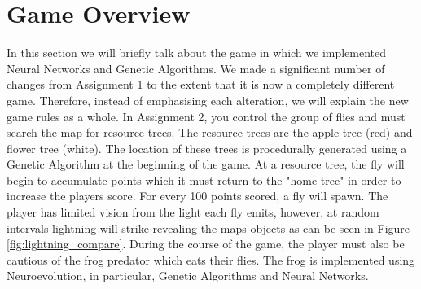 \section{Game Overview}
In this section we will briefly talk about the game in which we implemented Neural Networks and Genetic Algorithms.
We made a significant number of changes from Assignment 1 to the extent that it is now a completely different game. 
Therefore, instead of emphasising each alteration, we will explain the new game rules as a whole.
In Assignment 2, you control the group
of flies and must search the map for resource trees. The resource trees are the apple tree (red) and flower tree (white).
The location of these trees is procedurally generated using a Genetic Algorithm at the beginning of the game. At a resource tree, the fly will begin to accumulate points which it must return to the "home tree" in order to increase the players score. For every 100 points scored, a fly will spawn.
The player has limited vision from
the light each fly emits, however, at random intervals lightning will strike revealing the maps objects as can be seen in Figure \ref{fig:lightning_compare}. During the course
of the game, the player must also be cautious of the frog predator which eats their flies. The frog is implemented using Neuroevolution, in particular, Genetic Algorithms and Neural Networks.
